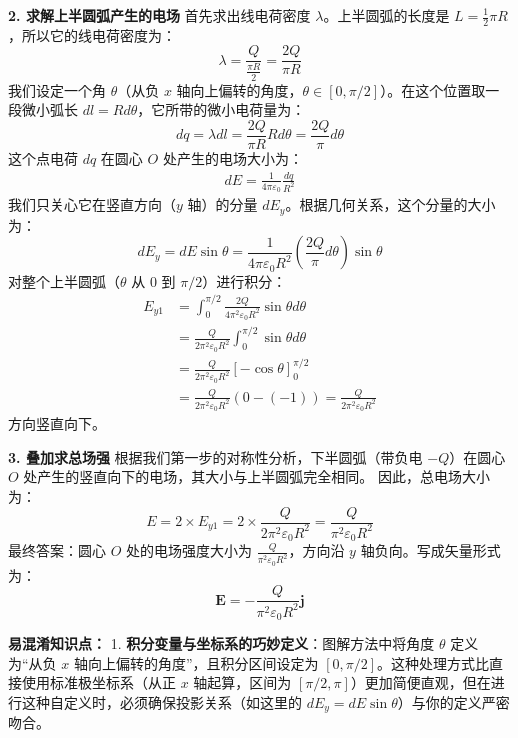 \textbf{2. 求解上半圆弧产生的电场}
首先求出线电荷密度 $\lambda$。上半圆弧的长度是 $L = \frac{1}{2}\pi R$，所以它的线电荷密度为：
\begin{equation}\label{eq:7-9-1}
	\lambda = \frac{Q}{\frac{\pi R}{2}} = \frac{2Q}{\pi R}
\end{equation}
我们设定一个角 $\theta$（从负 $x$ 轴向上偏转的角度，$\theta \in [0, \pi/2]$）。在这个位置取一段微小弧长 $dl = R d\theta$，它所带的微小电荷量为：
\begin{equation}\label{eq:7-9-2}
	dq = \lambda dl = \frac{2Q}{\pi R} R d\theta = \frac{2Q}{\pi} d\theta
\end{equation}
这个点电荷 $dq$ 在圆心 $O$ 处产生的电场大小为：
\begin{align*}
	dE = \frac{1}{4\pi\varepsilon_0} \frac{dq}{R^2}
\end{align*}
我们只关心它在竖直方向（$y$ 轴）的分量 $dE_y$。根据几何关系，这个分量的大小为：
\begin{equation}\label{eq:7-9-3}
	dE_y = dE \sin\theta = \frac{1}{4\pi\varepsilon_0 R^2} \left( \frac{2Q}{\pi} d\theta \right) \sin\theta
\end{equation}
对整个上半圆弧（$\theta$ 从 $0$ 到 $\pi/2$）进行积分：
\begin{align*}
	E_{y1} &= \int_{0}^{\pi/2} \frac{2Q}{4\pi^2\varepsilon_0 R^2} \sin\theta d\theta \\
	&= \frac{Q}{2\pi^2\varepsilon_0 R^2} \int_{0}^{\pi/2} \sin\theta d\theta \\
	&= \frac{Q}{2\pi^2\varepsilon_0 R^2} [-\cos\theta]_0^{\pi/2} \\
	&= \frac{Q}{2\pi^2\varepsilon_0 R^2} (0 - (-1)) = \frac{Q}{2\pi^2\varepsilon_0 R^2}
\end{align*}
方向竖直向下。

\textbf{3. 叠加求总场强}
根据我们第一步的对称性分析，下半圆弧（带负电 $-Q$）在圆心 $O$ 处产生的竖直向下的电场，其大小与上半圆弧完全相同。
因此，总电场大小为：
\begin{equation}\label{eq:7-9-4}
	E = 2 \times E_{y1} = 2 \times \frac{Q}{2\pi^2\varepsilon_0 R^2} = \frac{Q}{\pi^2\varepsilon_0 R^2}
\end{equation}
最终答案：圆心 $O$ 处的电场强度大小为 $\frac{Q}{\pi^2\varepsilon_0 R^2}$，方向沿 $y$ 轴负向。写成矢量形式为：
\begin{equation}\label{eq:7-9-5}
	\mathbf{E} = -\frac{Q}{\pi^2\varepsilon_0 R^2} \mathbf{j}
\end{equation}

\textbf{易混淆知识点： }
1. \textbf{积分变量与坐标系的巧妙定义}：图解方法中将角度 $\theta$ 定义为“从负 $x$ 轴向上偏转的角度”，且积分区间设定为 $[0, \pi/2]$。这种处理方式比直接使用标准极坐标系（从正 $x$ 轴起算，区间为 $[\pi/2, \pi]$）更加简便直观，但在进行这种自定义时，必须确保投影关系（如这里的 $dE_y = dE \sin\theta$）与你的定义严密吻合。

